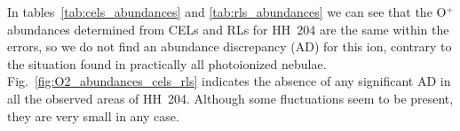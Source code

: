 \documentclass[twocolumn]{aastex63}
\begin{document}
In tables~\ref{tab:cels_abundances} and \ref{tab:rls_abundances} we can see that the O$^{+}$ abundances determined from CELs and RLs for  HH~204 are the same within the errors, so we do not find an abundance discrepancy (AD) for this ion, contrary to the situation found in practically all photoionized nebulae. Fig.~\ref{fig:O2_abundances_cels_rls} indicates the absence of any significant AD in all the observed areas of HH~204. Although some fluctuations seem to be present, they are very small in any case. 
\end{document}
